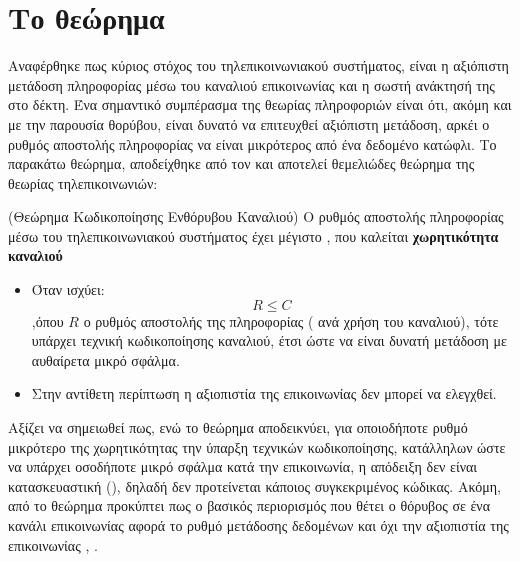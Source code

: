 \section{Το θεώρημα }
Αναφέρθηκε πως κύριος στόχος του τηλεπικοινωνιακού συστήματος, είναι η αξιόπιστη μετάδοση πληροφορίας μέσω του καναλιού επικοινωνίας και η σωστή ανάκτησή της στο δέκτη. Ένα σημαντικό συμπέρασμα της θεωρίας πληροφοριών είναι ότι, ακόμη και με την παρουσία θορύβου, είναι δυνατό να επιτευχθεί αξιόπιστη μετάδοση, αρκέι ο ρυθμός αποστολής πληροφορίας να είναι μικρότερος από ένα δεδομένο κατώφλι. Το παρακάτω θεώρημα, αποδείχθηκε από τον  και αποτελεί θεμελιώδες θεώρημα της θεωρίας τηλεπικοινωνιών:

\begin{theorem}(Θεώρημα Κωδικοποίησης Ενθόρυβου Καναλιού)
Ο ρυθμός αποστολής πληροφορίας μέσω του τηλεπικοινωνιακού συστήματος έχει μέγιστο , που καλείται \textbf{χωρητικότητα καναλιού}
\begin{itemize}
\item Όταν ισχύει:
\begin{equation}
R\leq{C}
\end{equation}
,όπου $R$ ο ρυθμός αποστολής της πληροφορίας ( ανά χρήση του καναλιού), τότε υπάρχει τεχνική κωδικοποίησης καναλιού, έτσι ώστε να είναι δυνατή μετάδοση με αυθαίρετα μικρό σφάλμα.
\item Στην αντίθετη περίπτωση η αξιοπιστία της επικοινωνίας δεν μπορεί να ελεγχθεί.
\end{itemize}
\label{theorem:shannon}
\end{theorem}


Αξίζει να σημειωθεί πως, ενώ το θεώρημα  αποδεικνύει, για οποιοδήποτε ρυθμό μικρότερο της χωρητικότητας την ύπαρξη τεχνικών κωδικοποίησης, κατάλληλων ώστε να υπάρχει οσοδήποτε μικρό σφάλμα κατά την επικοινωνία, η απόδειξη δεν είναι κατασκευαστική (), δηλαδή δεν προτείνεται κάποιος συγκεκριμένος κώδικας. Ακόμη, από το θεώρημα προκύπτει πως ο βασικός περιορισμός που θέτει ο θόρυβος σε ένα κανάλι επικοινωνίας αφορά το ρυθμό μετάδοσης δεδομένων και όχι την αξιοπιστία της επικοινωνίας \cite{proakis1994communication}, \cite{shannon1948mathematical}.

